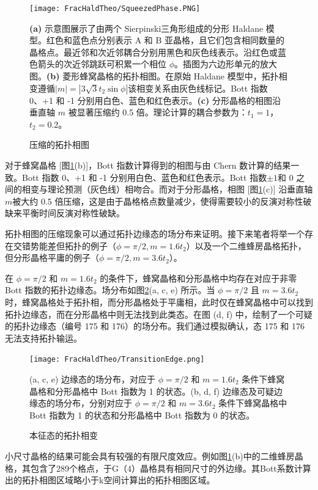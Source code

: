 \begin{figure}[htbp]
    \centering
    \texttt{[image: FracHaldTheo/SqueezedPhase.PNG]}
    \caption{压缩的拓扑相图}\textbf{(a)} 示意图展示了由两个 Sierpinski三角形组成的分形 Haldane 模型。红色和蓝色点分别表示 A 和 B 亚晶格，且它们包含相同数量的晶格点。最近邻和次近邻耦合分别用黑色和灰色线表示。沿红色或蓝色箭头的次近邻跳跃可积累一个相位 $\phi$。插图为六边形单元的放大图。\textbf{(b)} 菱形蜂窝晶格的拓扑相图。在原始 Haldane 模型中，拓扑相变遵循$|m| = |3\sqrt{3} t_2 \sin \phi|$该相变关系由灰色线标记。Bott 指数 0、+1 和 -1 分别用白色、蓝色和红色表示。\textbf{(c)} 分形晶格的相图沿垂直轴 $m$ 被显著压缩约 0.5 倍。理论计算的耦合参数为：$t_1 = 1$，$t_2 = 0.2$。
    \label{fig:SqueezedPhase}
\end{figure}

对于蜂窝晶格 [图\ref{fig:SqueezedPhase}(b)]，Bott 指数计算得到的相图与由 Chern 数计算的结果一致。Bott 指数 0、+1 和 -1 分别用白色、蓝色和红色表示。Bott 指数$\pm1$和 0 之间的相变与理论预测（灰色线）相吻合。而对于分形晶格，相图 [图\ref{fig:SqueezedPhase}(c)] 沿垂直轴$m$被大约 0.5 倍压缩，这是由于晶格格点数量减少，使得需要较小的反演对称性破缺来平衡时间反演对称性破缺。

拓扑相图的压缩现象可以通过拓扑边缘态的场分布来证明。接下来笔者将举一个存在交错势能差但拓扑的例子（$\phi = \pi/2, m = 1.6t_2$）以及一个二维蜂房晶格拓扑，但分形晶格平庸的例子（$\phi = \pi/2, m = 3.6t_2$）。

在 $\phi = \pi/2$ 和 $m = 1.6t_2$ 的条件下，蜂窝晶格和分形晶格中均存在对应于非零 Bott 指数的拓扑边缘态。场分布如图\ref{fig:TransitionEdge}(a, c, e) 所示。当 $\phi = \pi/2$ 且 $m = 3.6t_2$ 时，蜂窝晶格处于拓扑相，而分形晶格处于平庸相，此时仅在蜂窝晶格中可以找到拓扑边缘态，而在分形晶格中则无法找到此类态。在图 (d, f) 中，绘制了一个可疑的拓扑边缘态（编号 175 和 176）的场分布。我们通过模拟确认，态 175 和 176 无法支持拓扑输运。

\begin{figure}[htbp]
    \centering
    \texttt{[image: FracHaldTheo/TransitionEdge.png]}
    \caption{本征态的拓扑相变}(a, c, e) 边缘态的场分布，对应于 $\phi = \pi/2$ 和 $m = 1.6t_2$ 条件下蜂窝晶格和分形晶格中 Bott 指数为 1 的状态。(b, d, f) 边缘态及可疑边缘态的场分布，分别对应于 $\phi = \pi/2$ 和 $m = 3.6t_2$ 条件下蜂窝晶格中 Bott 指数为 1 的状态和分形晶格中 Bott 指数为 0 的状态。
    \label{fig:TransitionEdge}
\end{figure}

小尺寸晶格的结果可能会具有较强的有限尺度效应。例如图\ref{fig:SqueezedPhase}(b)中的二维蜂房晶格，其包含了289个格点，于G（4）晶格具有相同尺寸的外边缘。其Bott系数计算出的拓扑相图区域略小于k空间计算出的拓扑相图区域。

